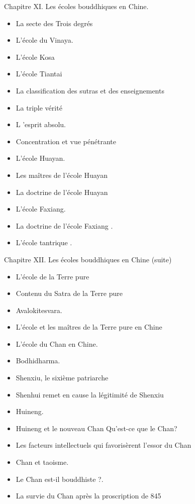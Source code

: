 Chapitre XI. Les écoles bouddhiques en Chine.
\begin{itemize}
    \item La secte des Trois degrés
    \item L'école du Vinaya.
    \item L'école Kosa
    \item L'école Tiantai
    \item La classification des sutras et des enseignements
    \item La triple vérité
    \item L 'esprit absolu.
    \item Concentration et vue pénétrante
    \item L'école Huayan.
    \item Les maîtres de l'école Huayan
    \item La doctrine de l'école Huayan
    \item L'école Faxiang.
    \item La doctrine de l'école Faxiang .
    \item L'école tantrique .
\end{itemize}

Chapitre XII. Les écoles bouddhiques en Chine (suite)

    \begin{itemize}
        \item L'école de la Terre pure
        \item Contenu du Satra de la Terre pure
        \item Avalokitesvara.
        \item L'école et les maîtres de la Terre pure en Chine
        \item L'école du Chan en Chine.
        \item Bodhidharma.
        \item Shenxiu, le sixième patriarche
        \item Shenhui remet en cause la légitimité de Shenxiu
        \item Huineng.
        \item Huineng et le nouveau Chan Qu'est-ce que le Chan?
        \item Les facteurs intellectuels qui favorisèrent l'essor du Chan
        \item Chan et taoisme.
        \item Le Chan est-il bouddhiste ?.
        \item La survie du Chan après la proscription de 845
    \end{itemize}

